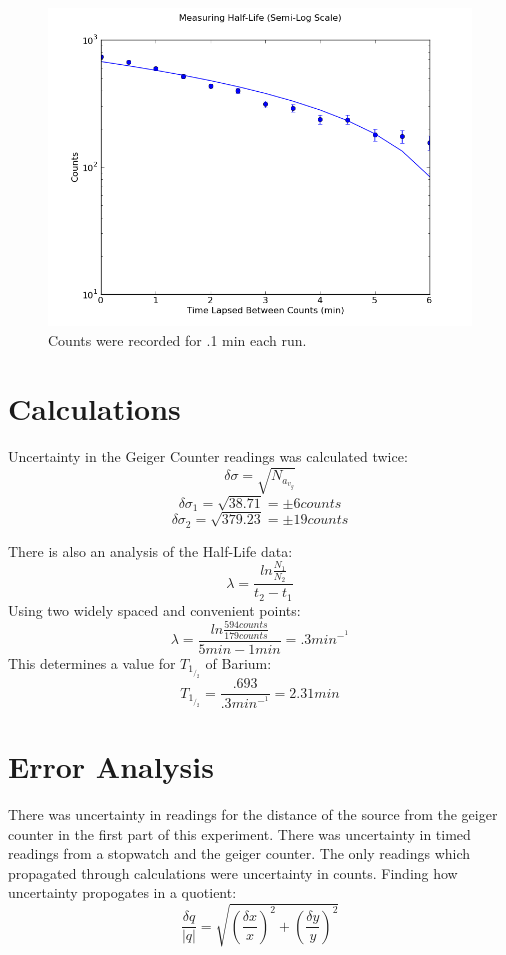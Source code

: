 \documentclass[12pt]{article}
\begin{document}
\begin{figure}[H]
\centering
\hspace{-0.0in}\includegraphics[scale=0.60]{Plot3.png}
\caption{Counts were recorded for .1 min each run. \label{fig:setup}}
\end{figure}

\section{Calculations}
\indent \indent Uncertainty in the Geiger Counter readings was calculated twice:
\[ \delta \sigma = \sqrt{N_a_v_g} \]
\[\delta \sigma_1 = \sqrt{38.71} = \pm 6 counts \]
\[\delta \sigma_2 = \sqrt{379.23} = \pm 19 counts \]

\indent There is also an analysis of the Half-Life data:
\[ \lambda = \frac{ln\frac{N_1}{N_2}}{t_2 - t_1} \]
\indent Using two widely spaced and convenient points:
\[ \lambda = \frac{ln\frac{594 counts}{179 counts}}{5 min - 1 min} = .3 min^-^1 \]
\indent This determines a value for $T_1_/_2$ of Barium:
\[ T_1_/_2 = \frac{.693}{.3 min^-^1} = 2.31 min \]

\section{Error Analysis}
\indent \indent There was uncertainty in readings for the distance of the source from the geiger counter in the first part of this experiment. There was uncertainty in timed readings from a stopwatch and the geiger counter. The only readings which propagated through calculations were uncertainty in counts. Finding how uncertainty propogates in a quotient:
\[\frac{\delta q}{|q|} = \sqrt{(\frac{\delta x}{x})^2 + (\frac{\delta y}{y})^2 } \]
\end{document}

